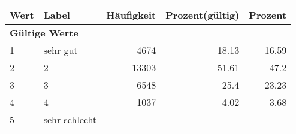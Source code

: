      \begin{longtable}{lXrrr}
     \toprule
     \textbf{Wert} & \textbf{Label} & \textbf{Häufigkeit} & \textbf{Prozent(gültig)} & \textbf{Prozent} \\
     \endhead
     \midrule
     \multicolumn{5}{l}{\textbf{Gültige Werte}}\\

     1 &
     \multicolumn{1}{X}{ sehr gut   } &


       \num{4674} &
       \num[round-mode=places,round-precision=2]{18.13} &
         \num[round-mode=places,round-precision=2]{16.59} \\

     2 &
     \multicolumn{1}{X}{ 2   } &


       \num{13303} &
       \num[round-mode=places,round-precision=2]{51.61} &
         \num[round-mode=places,round-precision=2]{47.2} \\

     3 &
     \multicolumn{1}{X}{ 3   } &


       \num{6548} &
       \num[round-mode=places,round-precision=2]{25.4} &
         \num[round-mode=places,round-precision=2]{23.23} \\

     4 &
     \multicolumn{1}{X}{ 4   } &


       \num{1037} &
       \num[round-mode=places,round-precision=2]{4.02} &
         \num[round-mode=places,round-precision=2]{3.68} \\

     5 &
     \multicolumn{1}{X}{ sehr schlecht   } &



\end{longtable}

